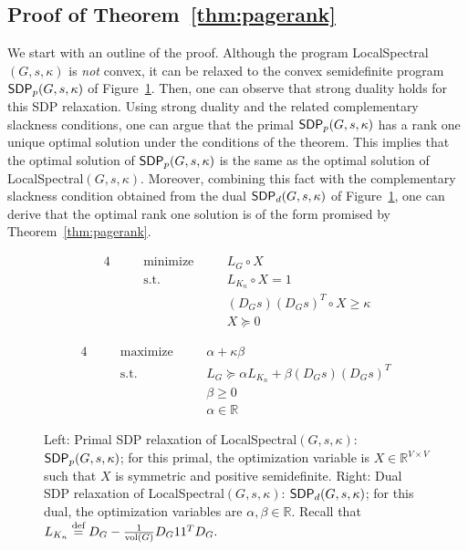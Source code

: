 \documentclass[11pt]{article}
\newcommand{\sdp}{{\sf SDP}}
\newcommand{\defeq}{\stackrel{\textup{def}}{=}}
\newcommand{\vol}{\mathrm{vol}}
\begin{document}
\subsection{Proof of Theorem~\ref{thm:pagerank}}
\label{sxn:optimize-proofs-pagerank}

We start with an outline of the proof.
Although the program \textsf{LocalSpectral}$(G,s,\kappa)$  is \emph{not} 
convex, it can be relaxed to the convex semidefinite program 
$\sdp_p(G,s, \kappa)$ of Figure~\ref{fig:sdp}. 
Then, one can observe that strong duality holds for this SDP relaxation. 
Using strong duality and the related complementary slackness conditions, one 
can argue that the primal $\sdp_p(G,s, \kappa)$ has a rank one unique optimal 
solution under the conditions of the theorem.
This implies that the optimal solution of $\sdp_p(G,s, \kappa)$ is the same 
as the optimal solution of \textsf{LocalSpectral}$(G,s, \kappa)$.
Moreover, combining this fact with the complementary slackness condition 
obtained from the dual $\sdp_d(G,s, \kappa)$ of Figure~\ref{fig:sdp}, one 
can derive that the optimal rank one solution is of the form promised by 
Theorem~\ref{thm:pagerank}.


\begin{figure}
\begin{minipage}{0.5\textwidth}
\begin{alignat*}{4}
\quad&  &\text{minimize} \quad &&  L_{G} \circ  X\\
&  &\text{s.t.} \quad &&  L_{K_{n}} \circ  X = 1\ \\
  &  & &&  ( D_{G} s)( D_{G} s)^T \circ  X \geq \kappa \\
  & & & & X \succeq 0
\end{alignat*} 
\end{minipage}
\begin{minipage}{.25\textwidth}
\begin{alignat*}{4}
\quad&  &\text{maximize} \quad && \alpha + \kappa \beta\\
&  &\text{s.t.} \quad &&  L_{G}  \succeq  \alpha  L_{K_{n}} + \beta ( D_{G} {s})( D_{G} {s})^T \ \\
  &  & &&  \beta \geq 0 \\
  & & & & \alpha \in \mathbb{R}
\end{alignat*}
\end{minipage}
\caption{
Left:  Primal SDP relaxation of \textsf{LocalSpectral}$(G,s, \kappa)$:  
$\sdp_{p}(G,s,\kappa)$;  
for this primal, the optimization variable is $X \in \mathbb{R}^{V \times V}$ 
such that $X$ is symmetric and positive semidefinite.
Right: Dual SDP relaxation of \textsf{LocalSpectral}$(G,s, \kappa)$: 
$\sdp_{d}(G,s,\kappa)$;
for this dual, the optimization variables are $\alpha,\beta\in\mathbb{R}$. 
Recall that $L_{K_{n}} \defeq D_{G}-\frac{1}{\vol(G)}D_{G}11^{T}D_{G}.$
}
\label{fig:sdp}
\end{figure} 
\end{document}

